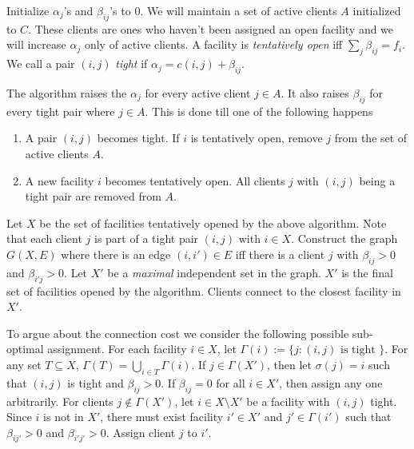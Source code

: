 \documentclass[11pt]{article}
\begin{document}
\noindent
Initialize $\alpha_j$'s and $\beta_{ij}$'s to $0$. We will maintain a set of active clients $A$ initialized to $C$.
These clients are ones who haven't been assigned an open facility and we will increase $\alpha_j$ only of active clients. A facility is {\em tentatively open} iff $\sum_j \beta_{ij} = f_i$.
We call a pair $(i,j)$ {\em tight} if $\alpha_j = c(i,j) + \beta_{ij}$. 

The algorithm raises the $\alpha_j$ for every active client $j\in A$. It also raises $\beta_{ij}$ for every tight pair where $j\in A$. This is done till one of the following happens
\begin{enumerate}
\item A pair $(i,j)$ becomes tight.  If $i$ is tentatively open, remove $j$ from the set of active clients $A$.

\item A new facility $i$ becomes tentatively open. All clients $j$ with $(i,j)$ being a tight pair are removed from $A$.
\end{enumerate}

Let $X$ be the set of facilities tentatively opened by the above algorithm. Note that each client $j$ 
is part of a tight pair $(i,j)$ with  $i \in X$. %
Construct the graph $G(X,E)$ where there is an edge $(i,i')\in E$ iff there is a client $j$  with $\beta_{ij} > 0$ and $\beta_{i'j} > 0$. Let $X'$ be a {\em maximal} independent set in the graph. $X'$ is the final set of facilities opened by the algorithm. Clients connect to the closest facility in $X'$.

To argue about the connection cost we consider the following possible sub-optimal assignment. 
For each facility $i\in X$, let $\Gamma(i) := \{j: (i,j) \textrm{ is tight } \}$. For any set $T\subseteq X$,  $\Gamma(T) = \bigcup_{i\in T} \Gamma(i)$. If $j\in \Gamma(X')$, then let $\sigma(j) = i$ such that $(i,j)$ is tight and $\beta_{ij} > 0$. If $\beta_{ij} = 0$ for all $i\in X'$, then assign any one arbitrarily.
For clients $j\notin \Gamma(X')$, let $i\in X\setminus X'$ be a facility with $(i,j)$ tight. Since $i$ is not in $X'$,
there must exist facility $i'\in X'$ and $j'\in \Gamma(i')$ such that $\beta_{ij'} > 0$ and $\beta_{i'j'} > 0$.
Assign client $j$ to $i'$.
%
\end{document}
